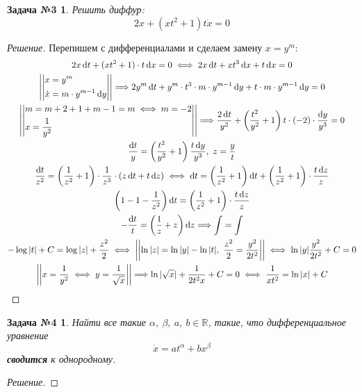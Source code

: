 \documentclass[a4paper,12pt]{article}
\newtheorem*{task3}{Задача №3}
\newtheorem*{task4}{Задача №4}
\newcommand{\R}{\mathbb{R}}
\renewcommand*\d{\mathop{}\!\mathrm{d}}
\newcommand{\dx}{\dot{x}}
\newcommand{\ds}{\displaystyle}
\begin{document}
\begin{task3}
	Решить диффур:
	\[2x + (xt^2 + 1)t\dx = 0\]
\end{task3}
\begin{proof}[Решение]
	Перепишем с дифференциалами и сделаем замену $x = y^m$:
	\begin{gather*}
		2x\d t + (xt^2 + 1)\cdot t \d x = 0 \iff 2x\d t + xt^3\d x + t\d x = 0\\
		\left|\left|\begin{gathered}
			x = y^m\hfill\\
			\dx = m\cdot y^{m - 1}\d y\hfill
		\end{gathered}\right|\right| \Longrightarrow
		2y^m\d t + y^m \cdot t^3 \cdot m\cdot y^{m - 1}\d y + t\cdot m\cdot y^{m - 1}\d y = 0\\
		\left|\left|\begin{gathered}m = m + 2 + 1 + m - 1 = m \iff m = -2\hfill\\ x = \dfrac{1}{y^2}\hfill\end{gathered}\right|\right| \Longrightarrow \dfrac{2\d t}{y^2} + \left(\dfrac{t^2}{y^2} + 1\right)t \cdot (-2) \cdot \dfrac{\d y}{y^3} = 0\\
		\dfrac{\d t}{y} = \left(\dfrac{t^2}{y^2} + 1\right)\dfrac{t\d y}{y^3},\ z = \dfrac{y}{t}\\
		\dfrac{\d t}{z^2} = \left(\dfrac{1}{z^2} + 1\right) \cdot \dfrac{1}{z^3}\cdot(z\d t + t\d z) \iff
		\d t = \left(\dfrac{1}{z^2} + 1\right)\d t + \left(\dfrac{1}{z^2} + 1\right)\cdot \dfrac{t\d z}{z}\\
		\left(1 - 1 - \dfrac{1}{z^2}\right)\d t = \left(\dfrac{1}{z^2} + 1\right)\cdot \dfrac{t\d z}{z}\\
		-\dfrac{\d t}{t} = \left(\dfrac{1}{z} + z\right)\d z \Longrightarrow \ds\int= \int\\
		-\log|t| + C = \log|z| + \dfrac{z^2}{2} \iff \left|\left|\ln|z| = \ln|y| - \ln|t|,\ \dfrac{z^2}{2} = \dfrac{y^2}{2t^2}\right|\right| \iff \ln|y| \dfrac{y^2}{2t^2} + C = 0\\
		\left|\left|x = \dfrac{1}{y^2} \iff y = \dfrac{1}{\sqrt{x}}\right|\right| \Longrightarrow \ln|\sqrt{x}| + \dfrac{1}{2t^2x} + C = 0 \iff \dfrac{1}{xt^2} = \ln|x| + C
	\end{gather*}
\end{proof}

\begin{task4}
	Найти все такие $\alpha,\ \beta,\ a,\ b \in \R$, такие, что дифференциальное уравнение
	\[\dx = at^\alpha + bx^\beta\] \textbf{сводится} к однородному.
\end{task4}
\begin{proof}[Решение]

\end{proof}
\end{document}
